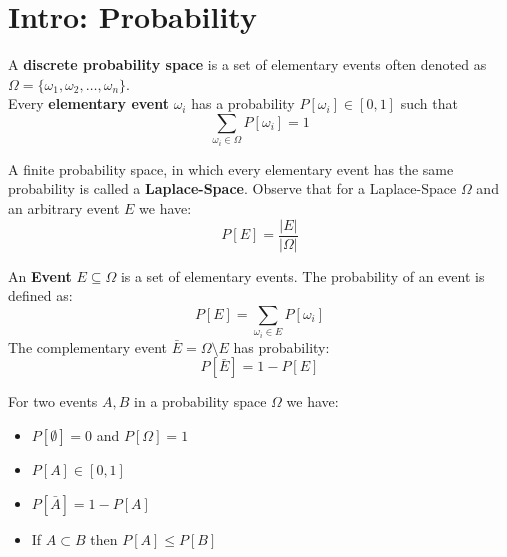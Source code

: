 \section{Intro: Probability}

\begin{definition}

    A \textbf{discrete probability space} is a set of elementary events often denoted as $\Omega = \{
    \omega_1,
    \omega_2, \dots, \omega_n \}$.
    \\

    Every \textbf{elementary event} $\omega_i$ has a probability $P[\omega_i] \in [0,1]$ such that
    $$\sum_{\omega_i \in \Omega} P[\omega_i] = 1$$
    
\end{definition}

\begin{remark}

    A finite probability space, in which every elementary event has the same probability is called a
    \textbf{Laplace-Space}. Observe that for a Laplace-Space $\Omega$ and an arbitrary event $E$ we have:
    $$P[E] = \frac{\vert E \vert}{\vert \Omega \vert}$$
    
\end{remark}

\begin{definition}

    An \textbf{Event} $E \subseteq \Omega$ is a set of elementary events. The probability of an event is
    defined as:
    $$P[E] = \sum_{\omega_i \in E} P[\omega_i]$$
    The complementary event $\bar{E} = \Omega \setminus E$ has probability:
    $$P[\bar{E}] = 1 - P[E]$$
    
\end{definition}

\begin{theorem}

    For two events $A, B$ in a probability space $\Omega$ we have:
    \begin{itemize}
    \item $P[\emptyset] = 0$ and $P[\Omega] = 1$
    \item $P[A] \in [0,1]$
    \item $P[\bar{A}] = 1 - P[A]$
    \item If $A \subset B$ then $P[A] \le P[B]$
\end{itemize}

\end{theorem}

